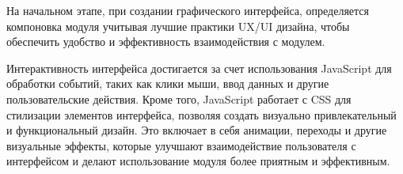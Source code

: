 На начальном этапе, при создании графического интерфейса, определяется компоновка модуля учитывая лучшие практики UX/UI дизайна, чтобы обеспечить удобство и эффективность взаимодействия с модулем.

Интерактивность интерфейса достигается за счет использования JavaScript для обработки событий, таких как клики мыши, ввод данных и другие пользовательские действия. Кроме того, JavaScript работает с CSS для стилизации элементов интерфейса, позволяя создать визуально привлекательный и функциональный дизайн. Это включает в себя анимации, переходы и другие визуальные эффекты, которые улучшают взаимодействие пользователя с интерфейсом и делают использование модуля более приятным и эффективным.







